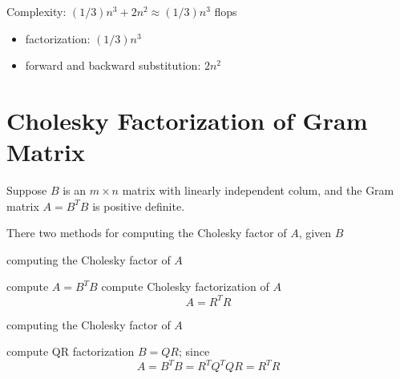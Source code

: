 Complexity: $ (1 / 3) n^{3}+2 n^{2} \approx(1 / 3) n^{3} $ flops

\begin{itemize}
    \item factorization: $ (1 / 3) n^{3} $
    \item forward and backward substitution: $ 2 n^{2} $
\end{itemize}


\section{Cholesky Factorization of Gram Matrix}
Suppose $ B $ is an $ m \times n $ matrix with linearly independent colum, and the Gram matrix $ A=B^{T} B $ is positive definite.

There two methods for computing the Cholesky factor of $ A $, given $ B $

\begin{algorithm}
    \caption{computing the Cholesky factor of $ A $}
    compute $ A=B^{T} B $\;
    compute Cholesky factorization of $ A $
    \begin{equation}
    A=R^{T} R
    \end{equation}\;
    
\end{algorithm}

\begin{algorithm}
    \caption{computing the Cholesky factor of $ A $}

compute QR factorization $ B=Q R $; since
    \begin{equation}
    A=B^{T} B=R^{T} Q^{T} Q R=R^{T} R
    \end{equation}\;
\end{algorithm}

